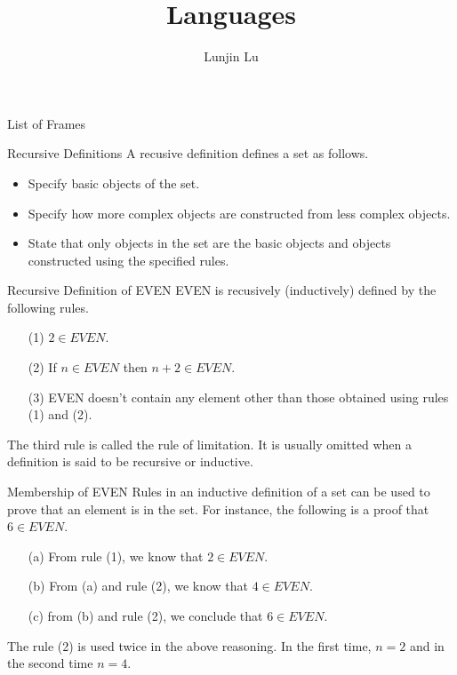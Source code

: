 \documentclass[notes=none]{beamer}
\title{Languages}
\author{Lunjin Lu}
\date{}
\makeatletter
\newif\ifframeinlbf
\newcommand\listofframes{\@starttoc{lbf}}
\makeatother
\begin{document}
\begin{comment}
\end{comment}
\frameinlbffalse
\begin{frame}{List of Frames}
    \listofframes
\end{frame}
\frameinlbftrue


\frame{ \titlepage
}

\begin{frame}{Recursive Definitions}
A recusive definition defines a set as follows.
\begin{itemize}
  \item Specify basic objects of the set.
  \item Specify how more complex objects
        are constructed from less complex objects.
  \item State that only objects in the set are the
  	basic objects and objects  constructed using the specified rules.
\end{itemize}

\end{frame}

\begin{frame}{Recursive Definition of EVEN}
EVEN is recusively (inductively) defined by the following rules.
\begin{itemize}
  \item [(1)]  $2\in EVEN$.
  \item [(2)] If $n\in EVEN$ then $n+2\in EVEN$.
  \item [(3)] EVEN doesn't contain any element other than those obtained using rules (1) and (2).
\end{itemize}

The third rule is called the rule of limitation. It is usually omitted
when a definition is said to be recursive or inductive.

\end{frame}

\begin{frame}{Membership of EVEN}
Rules in an inductive definition of a set can be used to
prove that an element is in the set. For instance,
the following is a proof that $6\in EVEN$.
\begin{itemize}
  \item [(a)] From rule (1), we know that  $2\in EVEN$.
  \item [(b)] From (a) and rule (2), we know that $4\in EVEN$.
  \item [(c)] from (b) and rule (2), we conclude that $6\in EVEN$.
\end{itemize}

The rule (2) is used twice in the above reasoning.
In the first time, $n=2$ and in the second time $n=4$.
\end{frame}
\end{document}
